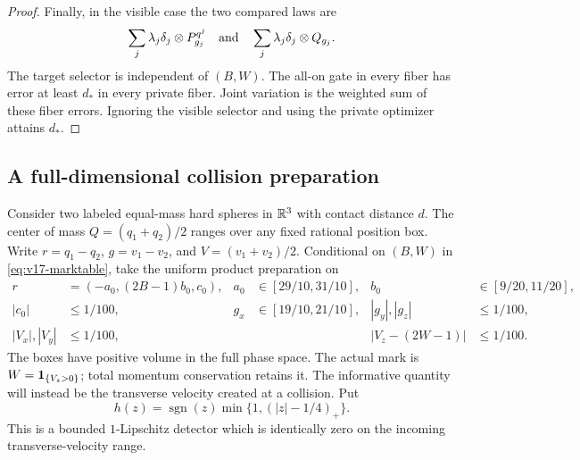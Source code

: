 \begin{proof}
Finally, in the visible case the two compared laws are
\[
 \sum_j\lambda_j\delta_j\otimes P^{q^j}_{g_j}
 \quad\hbox{and}\quad
 \sum_j\lambda_j\delta_j\otimes Q_{g_j}.
\]
The target selector is independent of $(B,W)$. The all-on gate in
every fiber has error at least $d_*$ in every private fiber. Joint
variation is the weighted sum of these fiber errors. Ignoring the
visible selector and using the private optimizer attains $d_*$.
\end{proof}

\subsection{A full-dimensional collision preparation}
Consider two labeled equal-mass hard spheres in $\mathbb R^3$ with contact
distance $d$. The center of mass $Q=(q_1+q_2)/2$ ranges over any fixed
rational position box. Write $r=q_1-q_2$, $g=v_1-v_2$, and
$V=(v_1+v_2)/2$. Conditional on $(B,W)$ in
\eqref{eq:v17-marktable}, take the uniform product preparation on
\begin{align}
 r&=(-a_0,(2B-1)b_0,c_0),
 &a_0&\in[29/10,31/10],& b_0&\in[9/20,11/20],
 \label{eq:v17-packets}\\
 |c_0|&\le1/100,
 &g_x&\in[19/10,21/10],& |g_y|,|g_z|&\le1/100,\nonumber\\
 |V_x|,|V_y|&\le1/100,
 &&&|V_z-(2W-1)|&\le1/100.\nonumber
\end{align}
The boxes have positive volume in the full phase space. The actual
mark is $W=\mathbf 1_{\{V_z>0\}}$; total momentum conservation retains it.
The informative quantity will instead be the transverse velocity
created at a collision. Put
\[
 h(z)=\operatorname{sgn}(z)\min\{1,(|z|-1/4)_+\}.
\]
This is a bounded $1$-Lipschitz detector which is identically zero
on the incoming transverse-velocity range.

